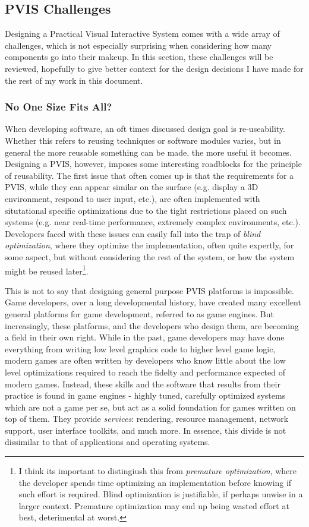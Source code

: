 \documentclass[12pt,oneside,letterpaper]{memoir}
\begin{document}
\subsection{PVIS Challenges}

Designing a Practical Visual Interactive System comes with a wide
array of challenges, which is not especially surprising when
considering how many components go into their makeup. In this section,
these challenges will be reviewed, hopefully to give better context
for the design decisions I have made for the rest of my work in this
document.

\subsubsection{No One Size Fits All?}

When developing software, an oft times discussed design goal is
re-useability. Whether this refers to reusing techniques or software
modules varies, but in general the more reusable something can be
made, the more useful it becomes. Designing a PVIS, however, imposes
some interesting roadblocks for the principle of reusability. The
first issue that often comes up is that the requirements for a PVIS,
while they can appear similar on the surface (e.g. display a 3D
environment, respond to user input, etc.), are often implemented
with situtational specific optimizations due to the tight restrictions
placed on such systems (e.g. near real-time performance, extremely
complex environments, etc.). Developers faced with these issues can
easily fall into the trap of \textit{blind optimization}, where they
optimize the implementation, often quite expertly, for some aspect,
but without considering the rest of the system, or how the system
might be reused later\footnote{I think its important to distingiush this from
\textit{premature optimization}, where the developer spends time
optimizing an implementation before knowing if such effort is
required. Blind optimization is justifiable, if perhaps unwise in a
larger context. Premature optimization may end up being wasted effort
at best, deterimental at worst.}.

This is not to say that designing general purpose PVIS platforms is
impossible. Game developers, over a long developmental history, have
created many excellent general platforms for game development,
referred to as game engines. But increasingly, these platforms, and
the developers who design them, are becoming a field in their own
right. While in the past, game developers may have done everything
from writing low level graphics code to higher level game logic,
modern games are often written by developers who know little about the
low level optimizations required to reach the fidelty and performance
expected of modern games. Instead, these skills and the software that
results from their practice is found in game engines - highly tuned,
carefully optimized systems which are not a game per se, but act as a
solid foundation for games written on top of them. They provide
\textit{services}: rendering, resource management, network support,
user interface toolkits, and much more. In essence, this divide is not
dissimilar to that of applications and operating systems. 
\end{document}
